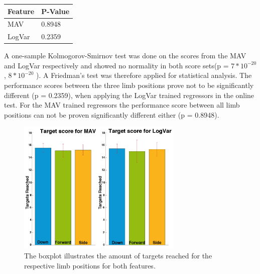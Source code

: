 	\begin{center}
		\begin{tabular}{l l}
			\toprule
			\textbf{Feature} & \textbf{P-Value}\\
			\midrule
			MAV & 0.8948 \\
			LogVar & 0.2359 \\
			\bottomrule
		\end{tabular}
	\end{center}

A one-sample Kolmogorov-Smirnov test was done on the scores from the MAV and LogVar respectively and showed no normality in both score sets(p = $7 * 10^{-20}$, $8 * 10^{-20}$ ). A Friedman's test was therefore applied for statistical analysis. The performance scores between the three limb positions prove not to be significantly different (p = 0.2359), when applying the LogVar trained regressors in the online test. For the MAV trained regressors the performance score between all limb positions can not be proven significantly different either (p = 0.8948). 

\begin{figure}[H]
	\includegraphics[width=0.7\textwidth]{figures/results/TargetsReached}  %
	\caption{The boxplot illustrates the amount of targets reached for the respective limb positions for both features.}
	\label{fig:TargetsReached}  %
\end{figure}

